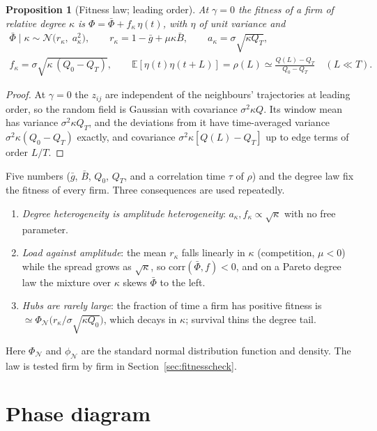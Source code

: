 \documentclass[11pt]{article}
\newcommand{\E}{\mathbb E}
\newcommand{\PhiN}{\Phi_{\mathcal N}}
\newcommand{\phiN}{\phi_{\mathcal N}}
\newcommand{\bPhi}{\bar\Phi}
\newtheorem{proposition}{Proposition}
\begin{document}
\begin{proposition}[Fitness law; leading order]\label{prop:law}
At $\gamma=0$ the fitness of a firm of relative degree $\kappa$ is $\Phi=\bPhi+f_\kappa\,\eta(t)$,
with $\eta$ of unit variance and
\begin{gather}
  \bPhi\mid\kappa\sim\mathcal N\bigl(r_\kappa,\;a_\kappa^2\bigr),\qquad
  r_\kappa=1-\bar g+\mu\kappa\bar B,\qquad a_\kappa=\sigma\sqrt{\kappa Q_T},\nonumber\\
  f_\kappa=\sigma\sqrt{\kappa\,(Q_0-Q_T)},\qquad
  \E[\eta(t)\eta(t+L)]=\rho(L)\simeq\frac{Q(L)-Q_T}{Q_0-Q_T}\quad(L\ll T).
  \label{eq:law}
\end{gather}
\end{proposition}
\begin{proof}
At $\gamma=0$ the $z_{ij}$ are independent of the neighbours' trajectories at leading order, so
the random field is Gaussian with covariance $\sigma^2\kappa Q$.  Its window mean has variance
$\sigma^2\kappa Q_T$, and the deviations from it have time-averaged variance $\sigma^2\kappa(Q_0-Q_T)$
exactly, and covariance $\sigma^2\kappa[Q(L)-Q_T]$ up to edge terms of order $L/T$.
\end{proof}
Five numbers ($\bar g$, $\bar B$, $Q_0$, $Q_T$, and a correlation time $\tau$ of $\rho$) and the
degree law fix the fitness of every firm.  Three consequences are used repeatedly.
\begin{enumerate}
  \item \emph{Degree heterogeneity is amplitude heterogeneity}: $a_\kappa,f_\kappa\propto\sqrt\kappa$
        with no free parameter.
  \item \emph{Load against amplitude}: the mean $r_\kappa$ falls linearly in $\kappa$ (competition,
        $\mu<0$) while the spread grows as $\sqrt\kappa$, so $\mathrm{corr}(\bPhi,f)<0$, and on a
        Pareto degree law the mixture over $\kappa$ skews $\bPhi$ to the left.
  \item \emph{Hubs are rarely large}: the fraction of time a firm has positive fitness is
        $\simeq\PhiN\bigl(r_\kappa/\sigma\sqrt{\kappa Q_0}\bigr)$, which decays in $\kappa$; survival
        thins the degree tail.
\end{enumerate}
Here $\PhiN$ and $\phiN$ are the standard normal distribution function and density.  The law is
tested firm by firm in Section~\ref{sec:fitnesscheck}.

\section{Phase diagram}
\label{sec:fixed}
\end{document}

